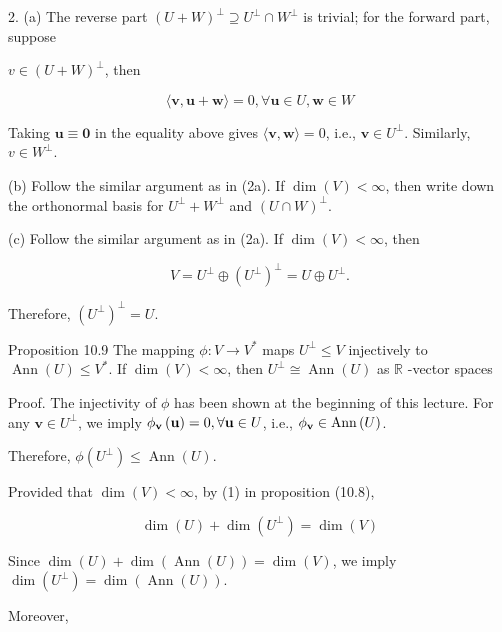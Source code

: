 \documentclass[11pt]{article}
\begin{document}
2. (a) The reverse part \({\left( U + W\right) }^{ \bot  } \supseteq  {U}^{ \bot  } \cap  {W}^{ \bot  }\) is trivial; for the forward part, suppose

\(v \in  {\left( U + W\right) }^{ \bot  }\), then

\[
\langle \mathbf{v},\mathbf{u} + \mathbf{w}\rangle  = 0,\forall \mathbf{u} \in  U,\mathbf{w} \in  W
\]

Taking \(\mathbf{u} \equiv  \mathbf{0}\) in the equality above gives \(\langle \mathbf{v},\mathbf{w}\rangle  = 0\), i.e., \(\mathbf{v} \in  {U}^{ \bot  }\). Similarly, \(v \in  {W}^{ \bot  }\).

(b) Follow the similar argument as in (2a). If \(\dim \left( V\right)  < \infty\), then write down the orthonormal basis for \({U}^{ \bot  } + {W}^{ \bot  }\) and \({\left( U \cap  W\right) }^{ \bot  }\).

(c) Follow the similar argument as in (2a). If \(\dim \left( V\right)  < \infty\), then

\[
V = {U}^{ \bot  } \oplus  {\left( {U}^{ \bot  }\right) }^{ \bot  } = U \oplus  {U}^{ \bot  }.
\]

Therefore, \({\left( {U}^{ \bot  }\right) }^{ \bot  } = U\).

Proposition 10.9 The mapping \(\phi  : V \rightarrow  {V}^{ * }\) maps \({U}^{ \bot  } \leq  V\) injectively to \(\operatorname{Ann}\left( U\right)  \leq  {V}^{ * }\). If \(\dim \left( V\right)  < \infty\), then \({U}^{ \bot  } \cong  \operatorname{Ann}\left( U\right)\) as \(\mathbb{R}\) -vector spaces

Proof. The injectivity of \(\phi\) has been shown at the beginning of this lecture. For any \(\mathbf{v} \in  {U}^{ \bot  }\), we imply \({\phi }_{\bf v}\left( \mathbf{u}\right)  = 0,\forall \mathbf{u} \in  U\), i.e., \({\phi }_{\bf v} \in  \operatorname{Ann}\left( U\right)\).

Therefore, \(\phi \left( {U}^{ \bot  }\right)  \leq  \operatorname{Ann}\left( U\right)\).

Provided that \(\dim \left( V\right)  < \infty\), by (1) in proposition (10.8),

\[
\dim \left( U\right)  + \dim \left( {U}^{ \bot  }\right)  = \dim \left( V\right)
\]

Since \(\dim \left( U\right)  + \dim \left( {\operatorname{Ann}\left( U\right) }\right)  = \dim \left( V\right)\), we imply \(\dim \left( {U}^{ \bot  }\right)  = \dim \left( {\operatorname{Ann}\left( U\right) }\right)\).

Moreover,
\end{document}
